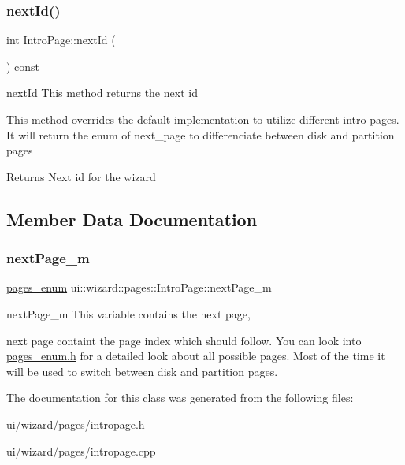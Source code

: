 \subsubsection{\texorpdfstring{next\+Id()}{nextId()}}
{\footnotesize\ttfamily int Intro\+Page\+::next\+Id (\begin{DoxyParamCaption}{ }\end{DoxyParamCaption}) const\hspace{0.3cm}{\ttfamily [override]}}



next\+Id This method returns the next id 

This method overrides the default implementation to utilize different intro pages. It will return the enum of next\+\_\+page to differenciate between disk and partition pages \begin{DoxyReturn}{Returns}
Next id for the wizard 
\end{DoxyReturn}


\subsection{Member Data Documentation}
\mbox{\label{classui_1_1wizard_1_1pages_1_1_intro_page_a8b77ec9feb8996a03d71f034ee3296ca}} 
\subsubsection{\texorpdfstring{next\+Page\+\_\+m}{nextPage\_m}}
{\footnotesize\ttfamily \mbox{\hyperlink{namespaceui_1_1wizard_1_1pages_a1a25c157e498474f0cf868944a52bf44}{pages\+\_\+enum}} ui\+::wizard\+::pages\+::\+Intro\+Page\+::next\+Page\+\_\+m\hspace{0.3cm}{\ttfamily [private]}}



next\+Page\+\_\+m This variable contains the next page, 

next page containt the page index which should follow. You can look into \mbox{\hyperlink{pages__enum_8h_source}{pages\+\_\+enum.\+h}} for a detailed look about all possible pages. Most of the time it will be used to switch between disk and partition pages. 

The documentation for this class was generated from the following files\+:\begin{DoxyCompactItemize}
\item 
ui/wizard/pages/intropage.\+h\item 
ui/wizard/pages/intropage.\+cpp\end{DoxyCompactItemize}
